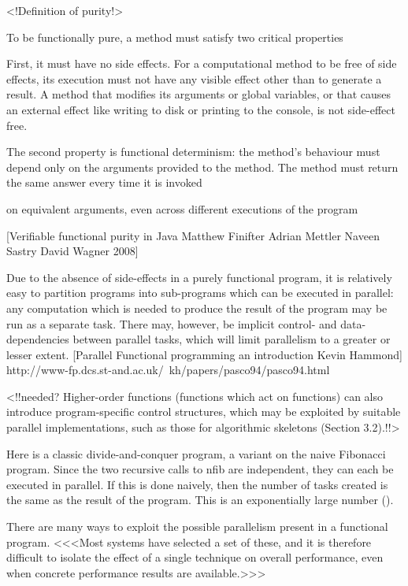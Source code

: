 \documentclass[main.tex]{subfiles}
\begin{document}
<!Definition of purity!>

To be functionally pure, a method must satisfy two critical properties

First, it must have no side effects. For a computational method to be free of side effects, its execution must not have any visible effect other than to generate a result. A method that modiﬁes its arguments or global variables, or that causes an external effect like writing to disk or printing to the console, is not side-effect free.



The second property is functional determinism: the method’s behaviour must depend only on the arguments provided to the method. The method must return the same answer every time it is invoked

on equivalent arguments, even across different executions of the program

[Verifiable functional purity in Java Matthew Finifter Adrian Mettler Naveen Sastry David Wagner 2008]



Due to the absence of side-effects in a purely functional program, it is relatively easy to partition programs into sub-programs which can be executed in parallel: any computation which is needed to produce the result of the program may be run as a separate task. There may, however, be implicit control- and data- dependencies between parallel tasks, which will limit parallelism to a greater or lesser extent. [Parallel Functional programming an introduction Kevin Hammond] http://www-fp.dcs.st-and.ac.uk/~kh/papers/pasco94/pasco94.html



<!!needed? Higher-order functions (functions which act on functions) can also introduce program-specific control structures, which may be exploited by suitable parallel implementations, such as those for algorithmic skeletons (Section 3.2).!!>



Here is a classic divide-and-conquer program, a variant on the naive Fibonacci program. Since the two recursive calls to nfib are independent, they can each be executed in parallel. If this is done naively, then the number of tasks created is the same as the result of the program. This is an exponentially large number ().





There are many ways to exploit the possible parallelism present in a functional program. <<<Most systems have selected a set of these, and it is therefore difficult to isolate the effect of a single technique on overall performance, even when concrete performance results are available.>>>
\end{document}
